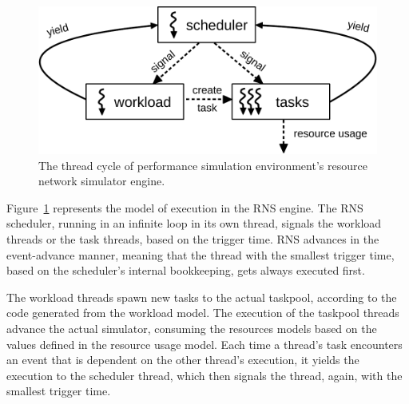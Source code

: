 \begin{figure}[]
  \begin{center}
    \includegraphics[width=\textwidth]{images/rns-threads-crop.pdf}
    \caption{The thread cycle of performance simulation environment's resource network simulator engine.}
    \label{fig:rns-threads}
  \end{center}
\end{figure}

Figure~\ref{fig:rns-threads} represents the model of execution in the RNS engine. The RNS scheduler, running in an infinite loop in its own thread, signals the workload threads or the task threads, based on the trigger time. RNS advances in the event-advance manner, meaning that the thread with the smallest trigger time, based on the scheduler's internal bookkeeping, gets always executed first.

The workload threads spawn new tasks to the actual taskpool, according to the code generated from the workload model. The execution of the taskpool threads advance the actual simulator, consuming the resources models based on the values defined in the resource usage model. Each time a thread's task encounters an event that is dependent on the other thread's execution, it yields the execution to the scheduler thread, which then signals the thread, again, with the smallest trigger time.

